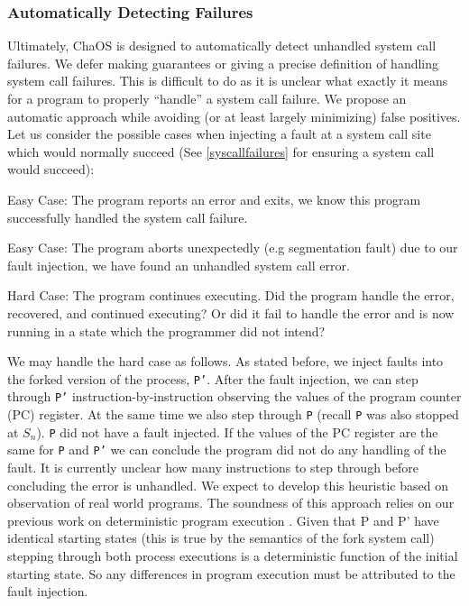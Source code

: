 \subsubsection{Automatically Detecting Failures}
Ultimately, ChaOS is designed to automatically detect unhandled system call failures. We defer making guarantees or giving a precise definition of handling system call failures. This is difficult to do as it is unclear what exactly it means for a program to properly ``handle'' a system call failure. We propose an automatic approach while avoiding (or at least largely minimizing) false positives. Let us consider the possible cases when injecting a fault at a system call site which would normally succeed (See \ref{syscallfailures} for ensuring a system call would succeed):
\begin{compactitem}

\item Easy Case: The program reports an error and exits, we know this program successfully handled the system call failure.
\item Easy Case: The program aborts unexpectedly (e.g segmentation fault) due to our fault injection, we have found an unhandled system call error.
\item Hard Case: The program continues executing. Did the program handle the error, recovered, and continued executing? Or did it fail to handle the error and is now running in a state which the programmer did not intend?
\end{compactitem}
We may handle the hard case as follows. As stated before, we inject faults into the forked version of the process, \texttt{P'}. After the fault injection, we can step through \texttt{P'} instruction-by-instruction observing the values of the program counter (PC) register. At the same time we also step through \texttt{P} (recall \texttt{P} was also stopped at $S_n$). \texttt{P} did not have a fault injected. If the values of the PC register are the same for \texttt{P} and \texttt{P'} we can conclude the program did not do any handling of the fault. It is currently unclear how many instructions to step through before concluding the error is unhandled. We expect to develop this heuristic based on observation of real world programs.
The soundness of this approach relies on our previous work on deterministic program execution \cite{dettrace}. Given that P and P’ have identical starting states (this is true by the semantics of the fork system call) stepping through both process executions is a deterministic function of the initial starting state. So any differences in program execution must be attributed to the fault injection.

